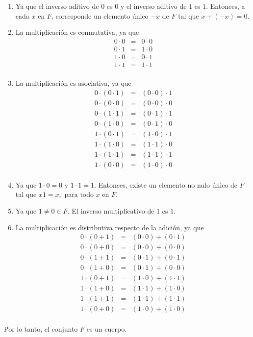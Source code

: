 \begin{enumerate}[\bfseries 1.]
\begin{enumerate}[\scriptsize 1.]
	    \item Ya que el inverso aditivo de $0$ es $0$ y el inverso aditivo de $1$ es $1$. Entonces, a cada $x$ en $F$, corresponde un elemento único $-x$ de $F$ tal que $x+(-x)=0$.

	    \item La multiplicación es conmutativa, ya que
		$$\begin{array}{rcl}
		    0\cdot 0 &=& 0\cdot 0\\
		    0\cdot 1 &=& 1\cdot 0\\
		    1\cdot 0 &=& 0\cdot 1\\
		    1\cdot 1 &=& 1\cdot 1\\
		\end{array}$$

	    \item La multiplicación es asociativa, ya que
		$$\begin{array}{rcl}
		    0\cdot (0\cdot 1) &=& (0\cdot 0)\cdot 1\\
		    0\cdot (0\cdot 0) &=& (0\cdot 0)\cdot 0\\
		    0\cdot (1\cdot 1) &=& (0\cdot 1)\cdot 1\\
		    0\cdot (1\cdot 0) &=& (0\cdot 1)\cdot 0\\
		    1\cdot (0\cdot 1) &=& (1\cdot 0)\cdot 1\\
		    1\cdot (1\cdot 0) &=& (1\cdot 1)\cdot 0\\
		    1\cdot (1\cdot 1) &=& (1\cdot 1)\cdot 1\\
		    1\cdot (0\cdot 0) &=& (1\cdot 0)\cdot 0\\
		\end{array}$$

	    \item Ya que $1\cdot 0=0$ y $1\cdot 1 = 1$. Entonces, existe un elemento no nulo único de $F$ tal que $x1=x,$ para todo $x$ en $F$.

	    \item Ya que $1\neq 0 \in F$. El inverso multiplicativo de $1$ es $1$.

	    \item La multiplicación es distributiva respecto de la adición, ya que
		$$\begin{array}{rcl}
		    0\cdot (0+1) &=& (0\cdot 0)+(0\cdot 1)\\
		    0\cdot (0+0) &=& (0\cdot 0)+(0\cdot 0)\\
		    0\cdot (1+1) &=& (0\cdot 1)+(0\cdot 1)\\
		    0\cdot (1+0) &=& (0\cdot 1)+(0\cdot 0)\\
		    1\cdot (0+1) &=& (1\cdot 0)+(1\cdot 1)\\
		    1\cdot (1+0) &=& (1\cdot 1)+(1\cdot 0)\\
		    1\cdot (1+1) &=& (1\cdot 1)+(1\cdot 1)\\
		    1\cdot (0+0) &=& (1\cdot 0)+(1\cdot 0)\\
		\end{array}$$
	\end{enumerate}
	Por lo tanto, el conjunto $F$ es un cuerpo.\\\\



\end{enumerate}
